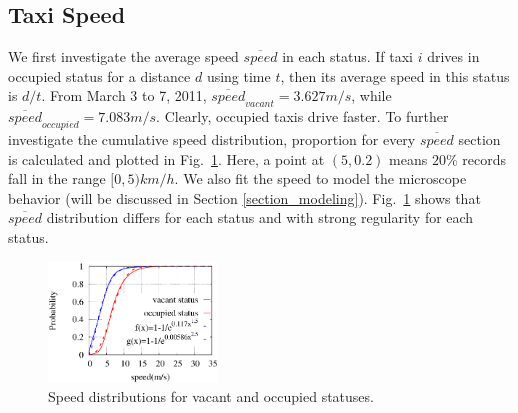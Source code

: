 \subsection{Taxi Speed}
We first investigate the average speed $\overline{speed}$ in each status. If taxi $i$ drives in occupied status for a distance $d$ using time $t$, then its average speed in this status is $d/t$.
From March 3 to 7, 2011, ${\overline{speed}_{vacant}} = 3.627 m/s$, while ${\overline{speed}_{occupied}}=7.083 m/s$. Clearly, occupied taxis drive faster. To further investigate the cumulative speed distribution, proportion for every $\overline{speed}$ section is calculated and plotted in Fig.~\ref{figure_speed_distribution}. Here, a point at $(5,0.2)$ means $20\%$ records fall in the range $[0,5)km/h$. We also fit the speed to model the microscope behavior (will be discussed in Section \ref{section_modeling}). Fig.~\ref{figure_speed_distribution} shows that $\overline{speed}$ distribution differs for each status and with strong regularity for each status.

\begin{figure}[!h]
\centering
\includegraphics[width=0.4\textwidth]{figures/fit/speedfit.eps}
\caption{Speed distributions for vacant and occupied statuses.}\label{figure_speed_distribution}
\end{figure}




